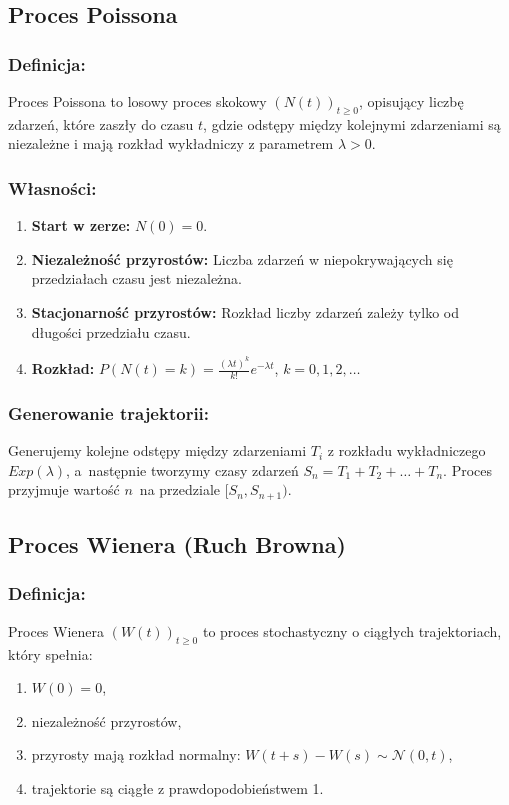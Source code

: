 \subsection{Proces Poissona}
\subsubsection*{Definicja:}
Proces Poissona to losowy proces skokowy $(N(t))_{t \geq 0}$, opisujący liczbę zdarzeń, które zaszły do czasu $t$, gdzie odstępy między kolejnymi zdarzeniami są niezależne i mają rozkład wykładniczy z parametrem $\lambda > 0$.

\subsubsection*{Własności:}

\begin{enumerate}
    \item \textbf{Start w zerze:} $N(0) = 0$.
    \item \textbf{Niezależność przyrostów:} Liczba zdarzeń w niepokrywających się przedziałach czasu jest niezależna.
    \item \textbf{Stacjonarność przyrostów:} Rozkład liczby zdarzeń zależy tylko od długości przedziału czasu.
    \item \textbf{Rozkład:} $P(N(t) = k) = \frac{(\lambda t)^k}{k!} e^{-\lambda t}$, $k = 0,1,2,\dots$
\end{enumerate}

\subsubsection*{Generowanie trajektorii:}
Generujemy kolejne odstępy między zdarzeniami $T_i$ z rozkładu wykładniczego $Exp(\lambda)$, a~następnie tworzymy czasy zdarzeń $S_n = T_1 + T_2 + \dots + T_n$. Proces przyjmuje wartość $n$~na przedziale $[S_n, S_{n+1})$.

\subsection{Proces Wienera (Ruch Browna)}
\subsubsection*{Definicja:}
Proces Wienera $(W(t))_{t \geq 0}$ to proces stochastyczny o ciągłych trajektoriach, który spełnia:

\begin{enumerate}
    \item $W(0) = 0$,
    \item niezależność przyrostów,
    \item przyrosty mają rozkład normalny: $W(t+s) - W(s) \sim \mathcal{N}(0, t)$,
    \item trajektorie są ciągłe z prawdopodobieństwem 1.
\end{enumerate}

